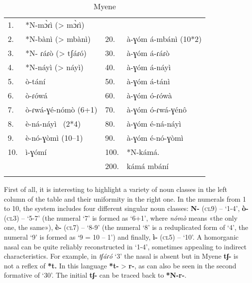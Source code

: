 \begin{table}
\caption{\label{tab:1:10} Myene }
\begin{tabularx}{\textwidth}{lXlX}
\lsptoprule

1. &*N-m{\`{ɔ}}ɾì (> m{\`{ɔ}}ɾì) & \\
2. &*N-b{\`{a}}nì (> mb{\`{a}}nì)  		& 20. &{\`{a}}-ɣ{\'{o}}m {\'{a}}-mb{\'{a}}nì      (10*2)\\
3. &*N- ɾ{\'{a}}ɾ{\`{o}} (> tʃ{\'{a}}ɾ{\'{o}}) 		& 30. & {\`{a}}-ɣ{\'{o}}m {\'{a}}-ɾ{\'{a}}ɾ{\`{o}}\\
4. &*N-n{\'{a}}yì  (> n{\'{a}}yì)  		& 40. & {\`{a}}-ɣ{\'{o}}m {\'{a}}-n{\'{a}}yì\\
5. &{\`{o}}-t{\'{a}}n{\'{i}} 				& 50. & {\`{a}}-ɣ{\'{o}}m {\'{a}}-t{\'{a}}nì\\
6. &{\`{o}}-ɾ{\'{o}}w{\'{a}} 				& 60. & {\`{a}}-ɣ{\'{o}}m {\'{o}}-ɾ{\'{o}}w{\`{a}}\\
7. &{\`{o}}-ɾw{\'{a}}-ɣ{\'{e}}-n{\'{o}}m{\`{o}} (6+1) 	& 70. & {\`{a}}-ɣ{\'{o}}m {\'{o}}-ɾw{\'{a}}-ɣ{\'{e}}n{\^{o}}\\
8. &{\`{e}}-n{\'{a}}-n{\'{a}}yì~   (2*4) 		& 80. & {\`{a}}-ɣ{\'{o}}m {\'{e}}-n{\'{a}}-n{\'{a}}yì \\
9. &{\`{e}}-n{\'{o}}-ɣ{\`{o}}mì   (10–1) 		& 90. & {\`{a}}-ɣ{\'{o}}m {\'{e}}-n{\'{o}}-ɣ{\`{o}}mì\\
10.& ì-ɣ{\'{o}}m{\'{i}} ~ 			& 100.& *N-k{\'{a}}m{\'{a}}. \\
   &           						& 200.& k{\'{a}}m{\'{a}} mb{\'{a}}n{\'{i}}\\
\lspbottomrule
\end{tabularx}
\end{table}

First of all, it is interesting to highlight a variety of noun classes in the left column of the table and their uniformity in the right one. In the numerals from 1 to 10, the system includes four different singular noun classes: \textbf{N-} (\textsc{cl}9) – ‘1-4’, \textbf{{\`{o}}-} (\textsc{cl}3) – ‘5-7’ (the numeral ‘7’ is formed as ‘6+1’, where \textit{n{\'{o}}m{\`{o}}} means «the only one, the same»), \textbf{{\`{e}}-} (\textsc{cl}7) – ‘8-9’ (the numeral ‘8’  is a reduplicated form of ‘4’, the numeral ‘9’ is formed as ‘9 = 10 – 1’) and finally, \textbf{ì-} (\textsc{cl}5) – ‘10’. A homorganic nasal can be quite reliably reconstructed in ‘1-4’, sometimes appealing to indirect characteristics. For example, in \textit{tʃ{\'{a}}ɾ{\'{o}}} ‘3’ the nasal is absent but in Myene \textbf{tʃ-} is not a reflex of \textbf{*t.}  In this language  \textbf{*t-} > \textbf{r-}, as can also be seen in the second formative of ‘30’. The initial \textbf{tʃ-} can be traced back to \textbf{*N-r-}.

